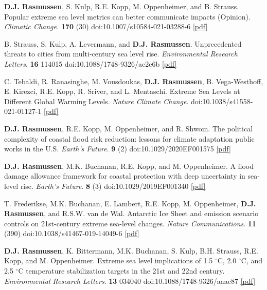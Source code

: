 \documentclass[10.5pt]{article}
\newcommand{\yr}[1]{{\sffamily\bfseries #1}}
\begin{document}
\begin{entries}
\item[\yr{2022}] \textbf{D.J. Rasmussen}, S. Kulp, R.E. Kopp, M. Oppenheimer, and B. Strauss. Popular extreme sea level metrics can better communicate impacts (Opinion). \emph{Climatic Change.} \textbf{170} (30) doi:10.1007/s10584-021-03288-6 \href{https://link.springer.com/article/10.1007/s10584-021-03288-6}{[pdf]}
\item[\yr{2021}] B. Strauss, S. Kulp, A. Levermann, and \textbf{D.J. Rasmussen}. Unprecedented threats to cities from multi-century sea level rise. \emph{Environmental Research Letters}. \textbf{16} 114015 doi:10.1088/1748-9326/ac2e6b \href{https://iopscience.iop.org/article/10.1088/1748-9326/ac2e6b/pdf}{[pdf]}
\item[\yr{2021}] C. Tebaldi, R. Ranasinghe, M. Vousdoukas, \textbf{D.J. Rasmussen}, B. Vega-Westhoff, E. Kirezci, R.E. Kopp, R. Sriver, and L. Mentaschi. Extreme Sea Levels at Different Global Warming Levels. \emph{Nature Climate Change}. doi:10.1038/s41558-021-01127-1 \href{https://www.nature.com/articles/s41558-021-01127-1}{[pdf]}
\item[\yr{2021}] \textbf{D.J. Rasmussen}, R.E. Kopp, M. Oppenheimer, and R. Shwom. The political complexity of coastal flood risk reduction: lessons for climate adaptation public works in the U.S. \emph{Earth's Future}. \textbf{9} (2) doi:10.1029/2020EF001575 \href{https://agupubs.onlinelibrary.wiley.com/doi/abs/10.1029/2020EF001575}{[pdf]}
\item[\yr{2020}] \textbf{D.J. Rasmussen}, M.K. Buchanan, R.E. Kopp, and M. Oppenheimer. A flood damage allowance framework for coastal protection with deep uncertainty in sea-level rise. \emph{Earth's Future}. \textbf{8} (3) doi:10.1029/2019EF001340 \href{https://agupubs.onlinelibrary.wiley.com/doi/epdf/10.1029/2019EF001340}{[pdf]}
\item[\yr{2020}] T. Frederikse, M.K. Buchanan, E. Lambert, R.E. Kopp, M. Oppenheimer, \textbf{D.J. Rasmussen}, and R.S.W. van de Wal. Antarctic Ice Sheet and emission scenario controls on 21st-century extreme sea-level changes. \emph{Nature Communications}. \textbf{11} (390) doi:10.1038/s41467-019-14049-6 \href{https://www.nature.com/articles/s41467-019-14049-6.pdf}{[pdf]}
\item[\yr{2018}] \textbf{D.J. Rasmussen}, K. Bittermann, M.K. Buchanan, S. Kulp, B.H. Strauss, R.E. Kopp, and M. Oppenheimer. Extreme sea level implications of 1.5 $^\circ$C, 2.0 $^\circ$C, and 2.5 $^\circ$C temperature stabilization targets in the 21st and 22nd century. \emph{Environmental Research Letters}. \textbf{13} 034040 doi:10.1088/1748-9326/aaac87 \href{https://iopscience.iop.org/article/10.1088/1748-9326/aaac87/pdf}{[pdf]}

\end{entries}
\end{document}
